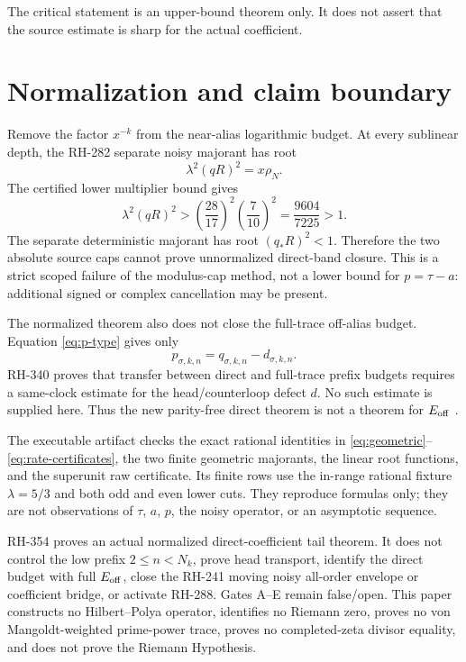 \documentclass[11pt]{article}
\theoremstyle{remark}
\begin{document}
The critical statement is an upper-bound theorem only.  It does not assert
that the source estimate is sharp for the actual coefficient.

\section{Normalization and claim boundary}

Remove the factor $x^{-k}$ from the near-alias logarithmic budget.  At every
sublinear depth, the RH-282 separate noisy majorant has root
\begin{equation}\label{eq:raw-root}
 \lambda^2(qR)^2=x\rho_N.
\end{equation}
The certified lower multiplier bound gives
\begin{equation}\label{eq:raw-superunit}
 \lambda^2(qR)^2
 >\left(\frac{28}{17}\right)^2\left(\frac7{10}\right)^2
 =\frac{9604}{7225}>1.
\end{equation}
The separate deterministic majorant has root $(q_*R)^2<1$.  Therefore the
two absolute source caps cannot prove unnormalized direct-band closure.  This
is a strict scoped failure of the modulus-cap method, not a lower bound for
$p=\tau-a$: additional signed or complex cancellation may be present.

The normalized theorem also does not close the full-trace off-alias budget.
Equation \eqref{eq:p-type} gives only
\begin{equation}\label{eq:pqd}
 p_{\sigma,k,n}=q_{\sigma,k,n}-d_{\sigma,k,n}.
\end{equation}
RH-340 proves that transfer between direct and full-trace prefix budgets
requires a same-clock estimate for the head/counterloop defect $d$.  No such
estimate is supplied here.  Thus the new parity-free direct theorem is not a
theorem for $E_{\rm off}$
\citep{WangSynchronization2026,WangBoundaryGap2026}.

The executable artifact checks the exact rational identities in
\eqref{eq:geometric}--\eqref{eq:rate-certificates}, the two finite geometric
majorants, the linear root functions, and the superunit raw certificate.  Its
finite rows use the in-range rational fixture $\lambda=5/3$ and both odd and
even lower cuts.  They reproduce formulas only; they are not observations of
$\tau$, $a$, $p$, the noisy operator, or an asymptotic sequence.

RH-354 proves an actual normalized direct-coefficient tail theorem.  It does
not control the low prefix $2\le n<N_k$, prove head transport, identify the
direct budget with full $E_{\rm off}$, close the RH-241 moving noisy all-order
envelope or coefficient bridge, or activate RH-288.  Gates A--E remain
false/open.  This paper constructs no Hilbert--Polya operator, identifies no
Riemann zero, proves no von Mangoldt-weighted prime-power trace, proves no
completed-zeta divisor equality, and does not prove the Riemann Hypothesis.



\end{document}
